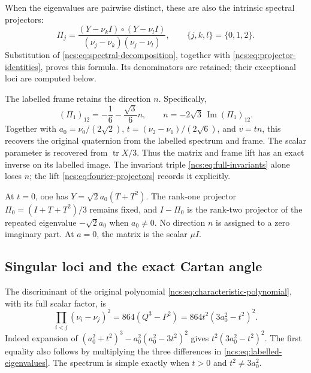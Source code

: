 \documentclass[11pt]{article}
\theoremstyle{definition}
\begin{document}
When the eigenvalues are pairwise distinct, these are also the
intrinsic spectral projectors:
\begin{equation}
 \Pi_j=
 \frac{(Y-\nu_kI)\circ(Y-\nu_lI)}
      {(\nu_j-\nu_k)(\nu_j-\nu_l)},
 \qquad\{j,k,l\}=\{0,1,2\}.
 \label{ncs:eq:intrinsic-projectors}\tag{NCS14}
\end{equation}
Substitution of \eqref{ncs:eq:spectral-decomposition}, together
with \eqref{ncs:eq:projector-identities}, proves this formula.
Its denominators are retained; their exceptional loci are
computed below.

The labelled frame retains the direction $n$. Specifically,
\begin{equation}
 (\Pi_1)_{12}=-\frac16-\frac{\sqrt3}{6}n,
 \qquad n=-2\sqrt3\,\operatorname{Im}(\Pi_1)_{12}.
 \label{ncs:eq:directional-inverse}\tag{NCS15}
\end{equation}
Together with
$a_0=\nu_0/(2\sqrt2)$,
$t=(\nu_2-\nu_1)/(2\sqrt6)$, and $v=tn$, this recovers the
original quaternion from the labelled spectrum and frame. The
scalar parameter is recovered from $\operatorname{tr}X/3$.
Thus the matrix and frame lift has an exact inverse on its
labelled image. The invariant triple
\eqref{ncs:eq:full-invariants} alone loses $n$; the lift
\eqref{ncs:eq:fourier-projectors} records it explicitly.

At $t=0$, one has $Y=\sqrt2a_0(T+T^2)$.
The rank-one projector $\Pi_0=(I+T+T^2)/3$ remains fixed, and
$I-\Pi_0$ is the rank-two projector of the repeated eigenvalue
$-\sqrt2a_0$ when $a_0\ne0$. No direction $n$ is assigned to a
zero imaginary part. At $a=0$, the matrix is the scalar $\mu I$.

\subsection{Singular loci and the exact Cartan angle}
\label{ncs:sec:singular-angle}

The discriminant of the original polynomial
\eqref{ncs:eq:characteristic-polynomial}, with its full scalar
factor, is
\begin{equation}
 \boxed{
 \prod_{i<j}(\nu_i-\nu_j)^2
       =864(Q^3-P^2)
       =864t^2(3a_0^2-t^2)^2.
 }
 \label{ncs:eq:discriminant}\tag{NCS16}
\end{equation}
Indeed expansion of
$(a_0^2+t^2)^3-a_0^2(a_0^2-3t^2)^2$ gives
$t^2(3a_0^2-t^2)^2$. The first equality also follows by
multiplying the three differences in
\eqref{ncs:eq:labelled-eigenvalues}. The spectrum is simple
exactly when $t>0$ and $t^2\ne3a_0^2$.
\end{document}
